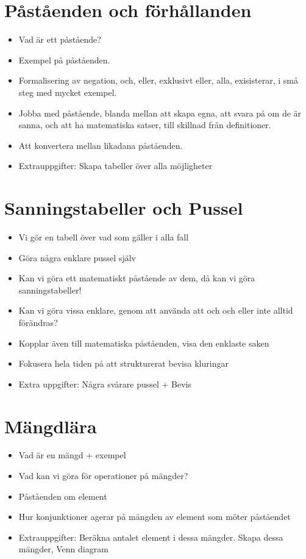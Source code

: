 \section{Påståenden och förhållanden}
\begin{itemize}
	\item Vad är ett påstående?
	\item Exempel på påståenden.
	\item Formalisering av negation, och, eller, exklusivt eller, alla, exisisterar, i små steg med mycket exempel.
	\item Jobba med påstående, blanda mellan att skapa egna, att svara på om de är sanna, och att ha matematiska satser, till skillnad från definitioner.
	\item Att konvertera mellan likadana påståenden.
	\item Extrauppgifter: Skapa tabeller över alla möjligheter
\end{itemize}

\section{Sanningstabeller och Pussel}
\begin{itemize}
	\item Vi gör en tabell över vad som gäller i alla fall
	\item Göra några enklare pussel själv
	\item Kan vi göra ett matematiskt påstående av dem, då kan vi göra sanningstabeller!
	\item Kan vi göra vissa enklare, genom att använda att och och eller inte alltid förändras?
	\item Kopplar även till matematiska påståenden, visa den enklaste saken
	\item Fokusera hela tiden på att strukturerat bevisa kluringar
	\item Extra uppgifter: Några svårare pussel + Bevis
\end{itemize}

\section{Mängdlära}
\begin{itemize}
	\item Vad är en mängd + exempel
	\item Vad kan vi göra för operationer på mängder?
	\item Påståenden om element
	\item Hur konjunktioner agerar på mängden av element som möter påståendet
	\item Extrauppgifter: Beräkna antalet element i dessa mängder. Skapa dessa mängder, Venn diagram
\end{itemize}

